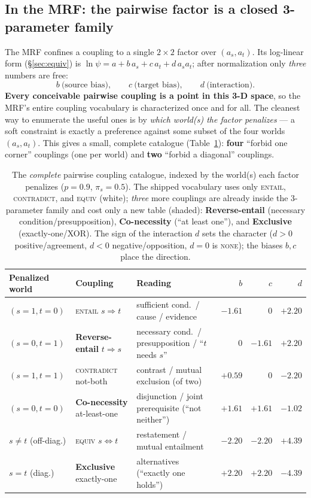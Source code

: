 \documentclass[11pt]{article}
\newcommand{\Ent}{\textsc{entail}}
\newcommand{\Con}{\textsc{contradict}}
\newcommand{\Equ}{\textsc{equiv}}
\newcommand{\None}{\textsc{none}}
\begin{document}
\subsection{In the MRF: the pairwise factor is a closed 3-parameter family}
\label{sec:couplings-mrf}
The MRF confines a coupling to a single $2\times2$ factor over $(a_s,a_t)$. Its log-linear
form (\S\ref{sec:equiv}) is $\ln\psi=a+b\,a_s+c\,a_t+d\,a_s a_t$; after normalization only
\emph{three} numbers are free:
\[
  b\ \text{(source bias)},\qquad c\ \text{(target bias)},\qquad d\ \text{(interaction)}.
\]
\textbf{Every conceivable pairwise coupling is a point in this 3-D space}, so the MRF's entire
coupling vocabulary is characterized once and for all. The cleanest way to enumerate the
useful ones is by \emph{which world(s) the factor penalizes} --- a soft constraint is exactly
a preference against some subset of the four worlds $(a_s,a_t)$. This gives a small, complete
catalogue (Table~\ref{tab:bcd}): \textbf{four} ``forbid one corner'' couplings (one per
world) and \textbf{two} ``forbid a diagonal'' couplings.

\begin{table}[h]\centering\small
\renewcommand{\arraystretch}{1.2}
\begin{tabular}{@{}llp{4.4cm}rrr@{}}
\toprule
\textbf{Penalized world} & \textbf{Coupling} & \textbf{Reading} & $b$ & $c$ & $d$\\
\midrule
$(s{=}1,t{=}0)$ & \Ent{} $s\!\Rightarrow\!t$        & sufficient cond.\ / cause / evidence & $-1.61$ & $0$ & $+2.20$\\
\rowcolor{cRule!40}
$(s{=}0,t{=}1)$ & \textbf{Reverse-entail} $t\!\Rightarrow\!s$ & necessary cond.\ / presupposition / ``$t$ needs $s$'' & $0$ & $-1.61$ & $+2.20$\\
$(s{=}1,t{=}1)$ & \Con{} not-both                   & contrast / mutual exclusion (of two) & $+0.59$ & $0$ & $-2.20$\\
\rowcolor{cRule!40}
$(s{=}0,t{=}0)$ & \textbf{Co-necessity} at-least-one & disjunction / joint prerequisite (``not neither'') & $+1.61$ & $+1.61$ & $-1.02$\\
\midrule
$s\ne t$ (off-diag.) & \Equ{} $s\!\Leftrightarrow\!t$ & restatement / mutual entailment & $-2.20$ & $-2.20$ & $+4.39$\\
\rowcolor{cRule!40}
$s=t$ (diag.)   & \textbf{Exclusive} exactly-one     & alternatives (``exactly one holds'') & $+2.20$ & $+2.20$ & $-4.39$\\
\bottomrule
\end{tabular}
\caption{The \emph{complete} pairwise coupling catalogue, indexed by the world(s) each factor
penalizes ($p{=}0.9$, $\pi_s{=}0.5$). The shipped vocabulary uses only \Ent{}, \Con{}, and
\Equ{} (white); \emph{three} more couplings are already inside the 3-parameter family and cost
only a new table (shaded): \textbf{Reverse-entail} (necessary condition/presupposition),
\textbf{Co-necessity} (``at least one''), and \textbf{Exclusive} (exactly-one/XOR). The sign
of the interaction $d$ sets the character ($d{>}0$ positive/agreement, $d{<}0$
negative/opposition, $d{=}0$ is \None{}); the biases $b,c$ place the direction.}
\label{tab:bcd}
\end{table}
\end{document}
